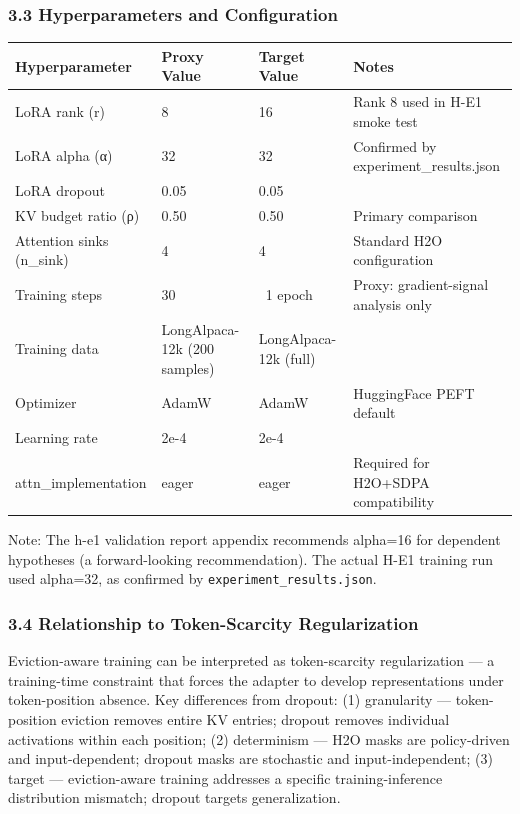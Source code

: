 \subsubsection{3.3 Hyperparameters and Configuration}

\begin{table}[htbp]
\centering
\begin{tabular}{llll}
\toprule
Hyperparameter & Proxy Value & Target Value & Notes \\
\midrule
LoRA rank (r) & 8 & 16 & Rank 8 used in H-E1 smoke test \\
LoRA alpha (α) & 32 & 32 & Confirmed by experiment_results.json \\
LoRA dropout & 0.05 & 0.05 &  \\
KV budget ratio (ρ) & 0.50 & 0.50 & Primary comparison \\
Attention sinks (n_sink) & 4 & 4 & Standard H2O configuration \\
Training steps & 30 & ~1 epoch & Proxy: gradient-signal analysis only \\
Training data & LongAlpaca-12k (200 samples) & LongAlpaca-12k (full) &  \\
Optimizer & AdamW & AdamW & HuggingFace PEFT default \\
Learning rate & 2e-4 & 2e-4 &  \\
attn_implementation & eager & eager & Required for H2O+SDPA compatibility \\
\bottomrule
\end{tabular}
\end{table}

Note: The h-e1 validation report appendix recommends alpha=16 for dependent hypotheses (a forward-looking recommendation). The actual H-E1 training run used alpha=32, as confirmed by \texttt{experiment_results.json}.

\subsubsection{3.4 Relationship to Token-Scarcity Regularization}

Eviction-aware training can be interpreted as token-scarcity regularization — a training-time constraint that forces the adapter to develop representations under token-position absence. Key differences from dropout: (1) granularity — token-position eviction removes entire KV entries; dropout removes individual activations within each position; (2) determinism — H2O masks are policy-driven and input-dependent; dropout masks are stochastic and input-independent; (3) target — eviction-aware training addresses a specific training-inference distribution mismatch; dropout targets generalization.

